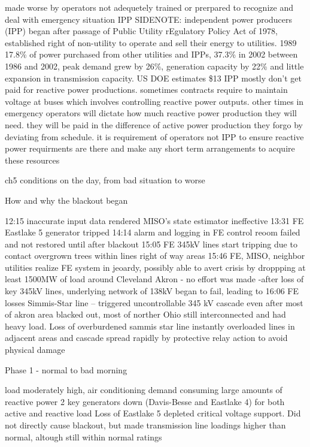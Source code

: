 made worse by operators not adequetely trained or prerpared to recognize and deal with emergency situation  
IPP SIDENOTE:
independent power producers (IPP) began after passage of Public Utility rEgulatory Policy Act of 1978, established right of non-utility to operate and sell their energy to utilities.  1989 17.8\% of power purchased from other utilities and IPPs, 37.3\% in 2002
between 1986 and 2002, peak demand grew by 26\%, generation capacity by 22\% and little expansion in transmission capacity.
US DOE estimates \$13
IPP mostly don't get paid for reactive power productions.  sometimes contracts require to maintain voltage at buses which involves controlling reactive power outputs.  other times in emergency operators will dictate how much reactive power production they will need.  they will be paid in the difference of active power production they forgo by deviating from schedule.  it is requirement of operators not IPP to ensure reactive power requirments are there and make any short term arrangements to acquire these resources

ch5 conditions on the day, from bad situation to worse

How and why the blackout began

12:15 inaccurate input data rendered MISO's state estimator ineffective
13:31 FE Eastlake 5 generator tripped
14:14 alarm and logging in FE control reoom failed and not restored until after blackout
15:05 FE 345kV lines start tripping due to contact overgrown trees within lines right of way areas
15:46 FE, MISO, neighbor utilities realize FE system in jeoardy, possibly able to avert crisis by droppping at least 1500MW of load around Cleveland Akron - no effort was made
-after loss of key 345kV lines, underlying network of 138kV began to fail, leading to
16:06 FE losses Simmis-Star line -- triggered uncontrollable 345 kV cascade 
even after most of akron area blacked out, most of norther Ohio still interconnected and had heavy load.  Loss of overburdened sammis star line instantly overloaded lines in adjacent areas and cascade spread rapidly by protective relay action to avoid physical damage

Phase 1 - normal to bad morning

load moderately high, air conditioning demand consuming large amounts of reactive power
2 key generators down (Davis-Besse and Eastlake 4) for both active and reactive load
Loss of Eastlake 5 depleted critical voltage support.  Did not directly cause blackout, but made transmission line loadings higher than normal, altough still within normal ratings

